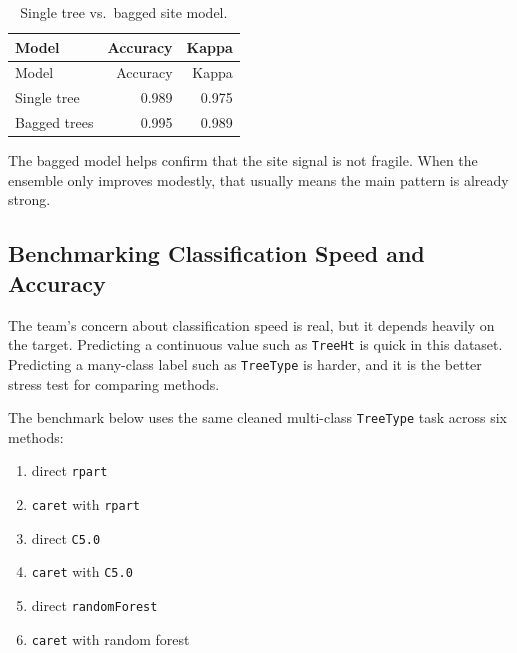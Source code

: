 \documentclass[
  11pt,
]{article}
\providecommand{\tightlist}{%
  \setlength{\itemsep}{0pt}\setlength{\parskip}{0pt}}
\begin{document}
\begin{longtable}[]{@{}lrr@{}}
\caption{Single tree vs.~bagged site model.}\tabularnewline
\toprule\noalign{}
Model & Accuracy & Kappa \\
\midrule\noalign{}
\endfirsthead
\toprule\noalign{}
Model & Accuracy & Kappa \\
\midrule\noalign{}
\endhead
\bottomrule\noalign{}
\endlastfoot
Single tree & 0.989 & 0.975 \\
Bagged trees & 0.995 & 0.989 \\
\end{longtable}

The bagged model helps confirm that the site signal is not fragile. When
the ensemble only improves modestly, that usually means the main pattern
is already strong.

\subsection{Benchmarking Classification Speed and
Accuracy}\label{benchmarking-classification-speed-and-accuracy}

The team's concern about classification speed is real, but it depends
heavily on the target. Predicting a continuous value such as
\texttt{TreeHt} is quick in this dataset. Predicting a many-class label
such as \texttt{TreeType} is harder, and it is the better stress test
for comparing methods.

The benchmark below uses the same cleaned multi-class \texttt{TreeType}
task across six methods:

\begin{enumerate}
\def\labelenumi{\arabic{enumi}.}
\tightlist
\item
  direct \texttt{rpart}
\item
  \texttt{caret} with \texttt{rpart}
\item
  direct \texttt{C5.0}
\item
  \texttt{caret} with \texttt{C5.0}
\item
  direct \texttt{randomForest}
\item
  \texttt{caret} with random forest
\end{enumerate}
\end{document}
